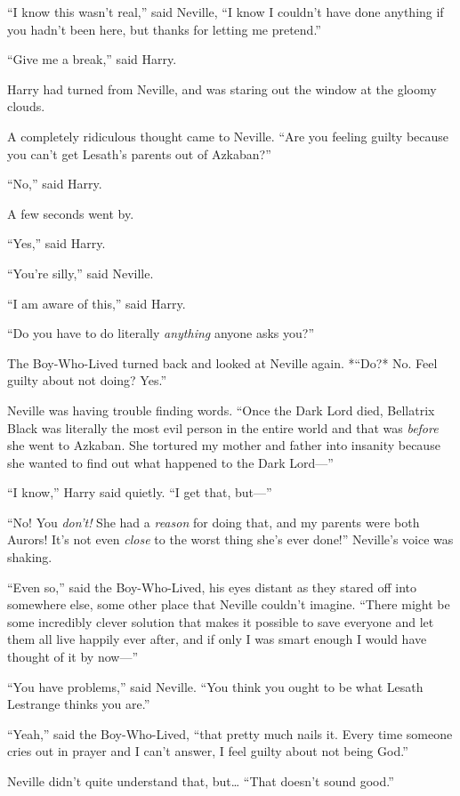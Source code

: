 ``I know this wasn't real,'' said Neville, ``I know I couldn't have done
anything if you hadn't been here, but thanks for letting me pretend.''

``Give me a break,'' said Harry.

Harry had turned from Neville, and was staring out the window at the
gloomy clouds.

A completely ridiculous thought came to Neville. ``Are you feeling
guilty because you can't get Lesath's parents out of Azkaban?''

``No,'' said Harry.

A few seconds went by.

``Yes,'' said Harry.

``You're silly,'' said Neville.

``I am aware of this,'' said Harry.

``Do you have to do literally \emph{anything} anyone asks you?''

The Boy-Who-Lived turned back and looked at Neville again. *``Do?* No.
Feel guilty about not doing? Yes.''

Neville was having trouble finding words. ``Once the Dark Lord died,
Bellatrix Black was literally the most evil person in the entire world
and that was \emph{before} she went to Azkaban. She tortured my mother
and father into insanity because she wanted to find out what happened to
the Dark Lord---''

``I know,'' Harry said quietly. ``I get that, but---''

``No! You \emph{don't!} She had a \emph{reason} for doing that, and my
parents were both Aurors! It's not even \emph{close} to the worst thing
she's ever done!'' Neville's voice was shaking.

``Even so,'' said the Boy-Who-Lived, his eyes distant as they stared off
into somewhere else, some other place that Neville couldn't imagine.
``There might be some incredibly clever solution that makes it possible
to save everyone and let them all live happily ever after, and if only I
was smart enough I would have thought of it by now---''

``You have problems,'' said Neville. ``You think you ought to be what
Lesath Lestrange thinks you are.''

``Yeah,'' said the Boy-Who-Lived, ``that pretty much nails it. Every
time someone cries out in prayer and I can't answer, I feel guilty about
not being God.''

Neville didn't quite understand that, but\ldots{} ``That doesn't sound
good.''

